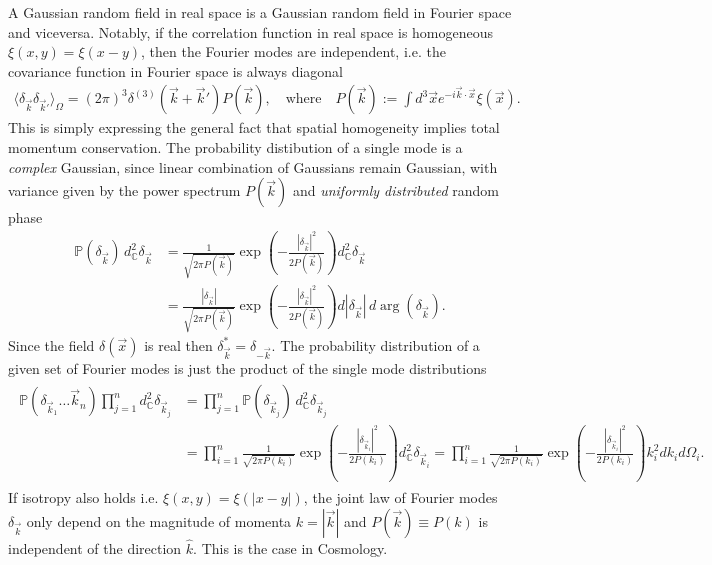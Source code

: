 A Gaussian random field in real space is a Gaussian random field in Fourier space and viceversa.
Notably, if the correlation function in real space is homogeneous $\xi(x,y)=\xi(x-y)$, then the Fourier modes are independent, i.e. the covariance function in Fourier space is always diagonal 
{\small\begin{align}
    \langle \delta_{\vec{k}} \delta_{\vec{k}'}\rangle_\Omega = (2\pi)^3 \delta^{(3)}(\vec{k}+\vec{k}') P(\vec{k}), \quad \text{where}\quad P(\vec{k}) := \int d^3\vec{x}e^{-i\vec{k}\cdot\vec{x}} \xi(\vec{x}).
\end{align}}
This is simply expressing the general fact that spatial homogeneity implies total momentum conservation.
The probability distibution of a single mode is a \emph{complex} Gaussian, since linear combination of Gaussians remain Gaussian, with variance given by the power spectrum $P(\vec{k})$ and \emph{uniformly distributed} random phase
\begin{align}
    \mathbb{P}(\delta_{\vec{k}})\, d^2_{\mathbb{C}}\!\delta_{\vec{k}}
    &= \frac{1}{\sqrt{2\pi P(\vec{k})}} \exp\left(-\frac{|\delta_{\vec{k}}|^2}{2P(\vec{k})}\right) d^2_{\mathbb{C}}\!\delta_{\vec{k}} \\
    &= \frac{|\delta_{\vec{k}}|}{\sqrt{2\pi P(\vec{k})}} \exp\left(-\frac{|\delta_{\vec{k}}|^2}{2P(\vec{k})}\right) d|\delta_{\vec{k}}|\, d\!\arg(\delta_{\vec{k}}).
\end{align}
Since the field $\delta(\vec{x})$ is real then $\delta_{\vec{k}}^* = \delta_{-\vec{k}}$.
The probability distribution of a given set of Fourier modes is just the product of the single mode distributions
{\small\begin{align}\begin{aligned}
    \mathbb{P}(\delta_{\vec{k}_1}\dots \vec{k}_n) \prod_{j=1}^n d^2_\mathbb{C}\!\delta_{\vec{k}_j} &= \prod_{j=1}^n \mathbb{P}(\delta_{\vec{k}_j})\, d^2_\mathbb{C}\!\delta_{\vec{k}_j} 
    \\
    &= \prod_{i=1}^n \frac{1}{\sqrt{2\pi P(k_i)}} \exp\left(-\frac{|\delta_{\vec{k}_i}|^2}{2P(k_i)}\right) d^2_\mathbb{C}\!\delta_{\vec{k}_i} = \prod_{i=1}^n \frac{1}{\sqrt{2\pi P(k_i)}} \exp\left(-\frac{|\delta_{\vec{k}_i}|^2}{2P(k_i)}\right) k_i^2 dk_i d\Omega_i.
\end{aligned}\end{align}}
If isotropy also holds i.e. $\xi(x,y)=\xi(|x-y|)$, the joint law of Fourier modes $\delta_{\vec{k}}$ only depend on the magnitude of momenta $k=|\vec k|$ and $P(\vec{k})\equiv P(k)$ is independent of the direction $\hat{k}$. 
This is the case in Cosmology.




